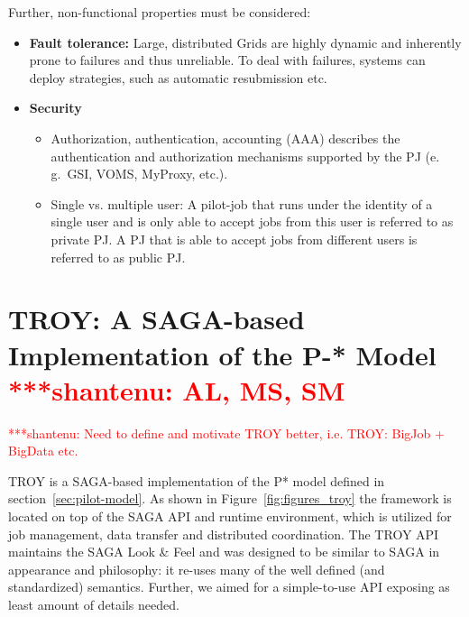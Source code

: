\documentclass[conference,final]{IEEEtran}
\newcommand{\jhanote}[1]{ {\textcolor{red} { ***shantenu: #1 }}}
\newcommand{\msnote}[1]{ {\textcolor{cyan} { ***mark: #1 }}}
\newcommand{\jhanote}[1]{}
\newcommand{\msnote}[1]{}
\begin{document}
Further, non-functional properties must be considered:
\begin{itemize}
		\item \textbf{Fault tolerance:} Large, distributed Grids are highly dynamic 
		and inherently prone to failures and thus unreliable. To deal with failures, 
		systems can deploy strategies, such as automatic resubmission etc.
		\item \textbf{Security}
		\begin{itemize}
	       \item Authorization, authentication, accounting (AAA) describes the 
	       authentication and authorization mechanisms supported by the PJ (e.\,g.\  
	       GSI, VOMS, MyProxy, etc.). 
		   \item Single vs. multiple user: A pilot-job that runs under the identity 
		   of a single user and is only able to accept jobs from this user is 
		   referred to as private PJ. A PJ that is able to accept jobs from 
		   different users is referred to as public PJ.
		\end{itemize}
\end{itemize}





\section{TROY: A SAGA-based Implementation of the P-* Model
  \jhanote{AL, MS, SM}}


\jhanote{Need to define and motivate TROY better, i.e. TROY: BigJob +
  BigData etc.}

TROY is a SAGA-based implementation of the P* model defined in 
section~\ref{sec:pilot-model}. As shown in Figure~\ref{fig:figures_troy} the 
framework is located on top of the SAGA API and runtime environment, which is 
utilized for job management, data transfer and distributed coordination. The 
TROY API maintains the SAGA Look \& Feel and was designed to be similar 
to SAGA in appearance and philosophy: it re-uses many of the well defined (and 
standardized) semantics. Further, we aimed for a simple-to-use API exposing as 
least amount of details needed.
\end{document}
